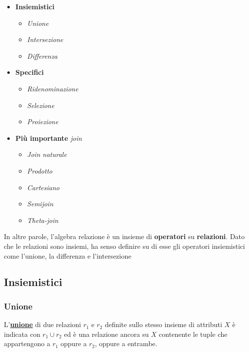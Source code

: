 \documentclass[a4paper]{article}
\begin{document}
	\begin{itemize}
		\item \textbf{Insiemistici}
		\begin{itemize}
			\item \emph{Unione}
			\item \emph{Intersezione}
			\item \emph{Differenza}
		\end{itemize}
	
		\item \textbf{Specifici}
		\begin{itemize}
			\item \emph{Ridenominazione}
			\item \emph{Selezione}
			\item \emph{Proiezione}
		\end{itemize}
		
		\item \textbf{Più importante} \emph{join}
		\begin{itemize}
			\item \emph{Join naturale}
			\item \emph{Prodotto}
			\item \emph{Cartesiano}
			\item \emph{Semijoin}
			\item \emph{Theta-join}
		\end{itemize}
	\end{itemize}

	\noindent
	In altre parole, l'algebra relazione è un insieme di \textbf{operatori} su \textbf{relazioni}. Dato che le relazioni sono insiemi, ha senso definire su di esse gli operatori insiemistici come l'unione, la differenza e l'intersezione
	
	\newpage
	
	\subsection{Insiemistici}

	\subsubsection{Unione}
	
	L'\textcolor{Red3}{\textbf{\underline{unione}}} di due relazioni $r_{1}$ e $r_{2}$ definite sullo stesso insieme di attributi $X$ è indicata con $r_{1} \cup r_{2}$ ed è una relazione ancora su $X$ contenente le tuple che appartengono a $r_{1}$ oppure a $r_{2}$, oppure a entrambe.\newline
	
\end{document}
